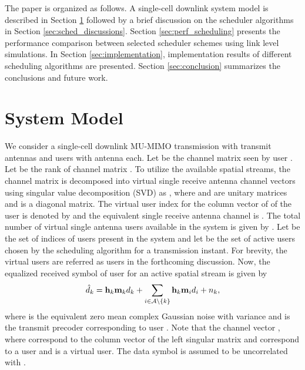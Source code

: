 \documentclass[conference,letterpaper,10pt]{./../../IEEE/IEEEtran}
\begin{document}
The paper is organized as follows. A single-cell downlink system model is described in Section \ref{sec:system_model} followed by a brief discussion on the scheduler algorithms in Section \ref{sec:sched_discussions}. Section \ref{sec:perf_scheduling} presents the performance comparison between selected scheduler schemes using link level simulations. In Section \ref{sec:implementation}, implementation results of different scheduling algorithms are presented. Section \ref{sec:conclusion} summarizes the conclusions and future work.

\section{System Model}
\label{sec:system_model}
We consider a single-cell downlink MU-MIMO transmission with  transmit antennas and  users with  antenna each. Let  be the channel matrix seen by user . Let  be the rank of channel matrix . To utilize the available spatial streams, the channel matrix  is decomposed into  virtual single receive antenna channel vectors using singular value decomposition (SVD) as , where  and  are unitary matrices and  is a diagonal matrix. The virtual user index for the  column vector of  of the  user is denoted by  and the equivalent single receive antenna channel is . The total number of virtual single antenna users available in the system is given by . Let  be the set of indices of users present in the system and let  be the set of active users chosen by the scheduling algorithm for a transmission instant. For brevity, the virtual users are referred as users in the forthcoming discussion. Now, the equalized received symbol  of user  for an active spatial stream is given by
\begin{equation}
\hat{d}_k = \mathbf{h}_{k} \mathbf{m}_{k} d_k + \sum_{i \in \mathcal{A} \backslash \{k\}} \mathbf{h}_{k} \mathbf{m}_{i} d_i + {n}_{k},
\end{equation}
where  is the equivalent zero mean complex Gaussian noise with variance  and  is the transmit precoder corresponding to user . Note that the channel vector , where  correspond to the  column vector of the left singular matrix  and  correspond to a user and  is a virtual user. The data symbol  is assumed to be uncorrelated with .
\end{document}
